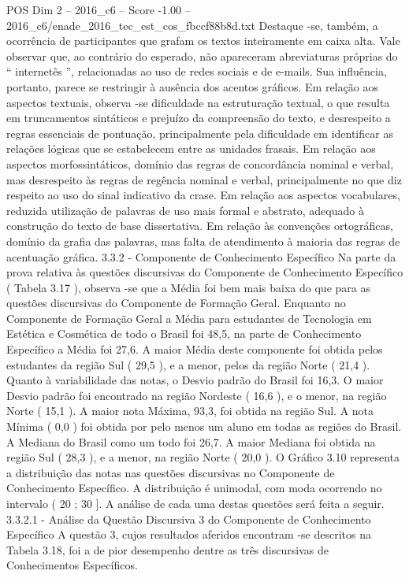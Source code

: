 \begin{textsample}{POS Dim 2 – 2016\_c6 – Score -1.00 – 2016\_c6/enade\_2016\_tec\_est\_cos\_fbccf88b8d.txt}
Destaque -se, também, a ocorrência de participantes que grafam os textos inteiramente em caixa alta.
Vale observar que, ao contrário do esperado, não apareceram abreviaturas próprias do “ internetês ”, relacionadas ao uso de redes sociais e de e-mails.
Sua influência, portanto, parece se restringir à ausência dos acentos gráficos.
Em relação aos aspectos textuais, observa -se dificuldade na estruturação textual, o que resulta em truncamentos sintáticos e prejuízo da compreensão do texto, e desrespeito a regras essenciais de pontuação, principalmente pela dificuldade em identificar as relações lógicas que se estabelecem entre as unidades frasais.
Em relação aos aspectos morfossintáticos, domínio das regras de concordância nominal e verbal, mas desrespeito às regras de regência nominal e verbal, principalmente no que diz respeito ao uso do sinal indicativo da crase.
Em relação aos aspectos vocabulares, reduzida utilização de palavras de uso mais formal e abstrato, adequado à construção do texto de base dissertativa.
Em relação às convenções ortográficas, domínio da grafia das palavras, mas falta de atendimento à maioria das regras de acentuação gráfica. 3.3.2 - Componente de Conhecimento Específico Na parte da prova relativa às questões discursivas do Componente de Conhecimento Específico ( Tabela 3.17 ), observa -se que a Média foi bem mais baixa do que para as questões discursivas do Componente de Formação Geral.
Enquanto no Componente de Formação Geral a Média para estudantes de Tecnologia em Estética e Cosmética de todo o Brasil foi 48,5, na parte de Conhecimento Específico a Média foi 27,6.
A maior Média deste componente foi obtida pelos estudantes da região Sul ( 29,5 ), e a menor, pelos da região Norte ( 21,4 ).
Quanto à variabilidade das notas, o Desvio padrão do Brasil foi 16,3.
O maior Desvio padrão foi encontrado na região Nordeste ( 16,6 ), e o menor, na região Norte ( 15,1 ).
A maior nota Máxima, 93,3, foi obtida na região Sul.
A nota Mínima ( 0,0 ) foi obtida por pelo menos um aluno em todas as regiões do Brasil.
A Mediana do Brasil como um todo foi 26,7.
A maior Mediana foi obtida na região Sul ( 28,3 ), e a menor, na região Norte ( 20,0 ).
O Gráfico 3.10 representa a distribuição das notas nas questões discursivas no Componente de Conhecimento Específico.
A distribuição é unimodal, com moda ocorrendo no intervalo ( 20 ; 30 ].
A análise de cada uma destas questões será feita a seguir. 3.3.2.1 - Análise da Questão Discursiva 3 do Componente de Conhecimento Específico A questão 3, cujos resultados aferidos encontram -se descritos na Tabela 3.18, foi a de pior desempenho dentre as três discursivas de Conhecimentos Específicos.

\end{textsample}
